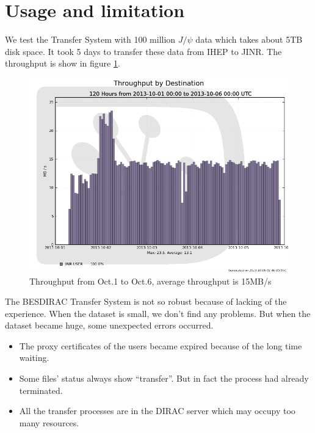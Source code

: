 \section{Usage and limitation}
We test the Transfer System with 100 million $J/\psi$ data 
which takes about 5TB disk space. It took 5 days to transfer 
these data from IHEP to JINR. The throughput is show in 
figure \ref{fig:throughput}.

\begin{figure}[h]
\includegraphics[width=.6\textwidth, keepaspectratio]{data/throughput-dest-1001-10-06.png}
\begin{minipage}[b]{.4\textwidth}
    \caption{\label{fig:throughput}Throughput from Oct.1 to Oct.6, 
    average throughput is 15MB/s}
\end{minipage}
\end{figure}

The BESDIRAC Transfer System is not so robust
because of lacking of the experience.
When the dataset is small, we don't find any problems.
But when the dataset became huge, some unexpected errors occurred.
\begin{itemize}
    \item The proxy certificates of the users became expired
            because of the long time waiting.
    \item Some files' status always show ``transfer''.
            But in fact the process had already terminated.
    \item All the transfer processes are in the DIRAC server
            which may occupy too many resources.
\end{itemize}
